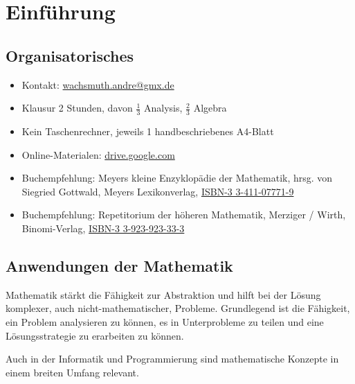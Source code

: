 \chapter{Einführung}

\section{Organisatorisches}

\begin{itemize}
	\item Kontakt: \href{mailto:wachsmuth.andre@gmx.de?subject=BA/Analysis 2020: }{wachsmuth.andre@gmx.de}
	\item Klausur 2 Stunden, davon $\frac{1}{3}$ Analysis, $\frac{2}{3}$ Algebra
	\item Kein Taschenrechner, jeweils 1 handbeschriebenes A4-Blatt
	\item Online-Materialen: \href{https://drive.google.com/drive/folders/1CJ0226zg1_bnbt7IopCLwDuK2hkOgHya?usp=sharing}{drive.google.com}
	\item Buchempfehlung: Meyers kleine Enzyklopädie der Mathematik, hrsg. von Siegried Gottwald, Meyers Lexikonverlag, \href{https://www.amazon.de/-/en/Siegfried-Gottwald/dp/3411077719}{ISBN-3 3-411-07771-9}
	\item Buchempfehlung: Repetitorium der höheren Mathematik, Merziger / Wirth, Binomi-Verlag, \href{https://www.amazon.de/-/en/Gerhard-Merziger/dp/3923923333}{ISBN-3 3-923-923-33-3}
\end{itemize}

\section{Anwendungen der Mathematik}

Mathematik stärkt die Fähigkeit zur Abstraktion und hilft bei der Lösung komplexer, auch nicht-mathematischer, Probleme. Grundlegend
ist die Fähigkeit, ein Problem analysieren zu können, es in Unterprobleme zu teilen und eine Lösungsstrategie zu erarbeiten zu können.

Auch in der Informatik und Programmierung sind mathematische Konzepte in einem breiten Umfang relevant.

